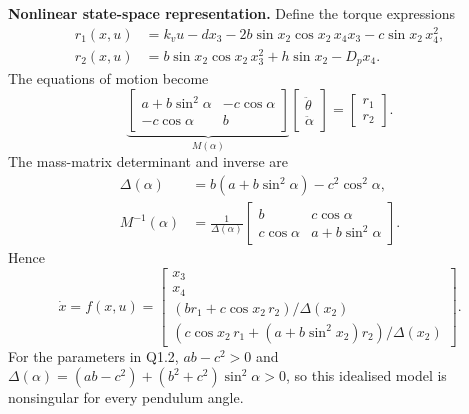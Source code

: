 \documentclass[11pt,a4paper]{article}
\begin{document}
\textbf{Nonlinear state-space representation.}
Define the torque expressions
\begin{align}
r_1(x,u)&=k_vu-dx_3-2b\sin x_2\cos x_2\,x_4x_3-c\sin x_2\,x_4^2,\\
r_2(x,u)&=b\sin x_2\cos x_2\,x_3^2+h\sin x_2-D_px_4.
\end{align}
The equations of motion become
\begin{equation}
\underbrace{\begin{bmatrix}
a+b\sin^2\alpha&-c\cos\alpha\\-c\cos\alpha&b
\end{bmatrix}}_{M(\alpha)}
\begin{bmatrix}\ddot\theta\\\ddot\alpha\end{bmatrix}
=\begin{bmatrix}r_1\\r_2\end{bmatrix}.
\end{equation}
The mass-matrix determinant and inverse are
\begin{align}
\Delta(\alpha)&=b(a+b\sin^2\alpha)-c^2\cos^2\alpha,\\
M^{-1}(\alpha)&=\frac1{\Delta(\alpha)}
\begin{bmatrix}b&c\cos\alpha\\c\cos\alpha&a+b\sin^2\alpha\end{bmatrix}.
\end{align}
Hence
\begin{equation}\label{eq:nonlinear_ss}
\boxed{\dot x=f(x,u)=
\begin{bmatrix}
x_3\\x_4\\
(br_1+c\cos x_2\,r_2)/\Delta(x_2)\\
(c\cos x_2\,r_1+(a+b\sin^2x_2)r_2)/\Delta(x_2)
\end{bmatrix}.}
\end{equation}
For the parameters in Q1.2, $ab-c^2>0$ and
$\Delta(\alpha)=(ab-c^2)+(b^2+c^2)\sin^2\alpha>0$, so this idealised
model is nonsingular for every pendulum angle.
\end{document}
